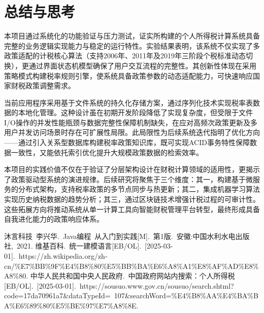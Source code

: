 \documentclass[a4paper, utf8]{ctexart}
\begin{document}
    \section{总结与思考}

    本项目通过系统化的功能验证与压力测试，证实所构建的个人所得税计算系统具备完整的业务逻辑实现能力与稳定的运行特性。实验结果表明，该系统不仅实现了多政策适配的计税核心算法（支持2006年、2011年及2019年三阶段个税标准动态切换），更通过界面状态机模型确保了用户交互流程的完整性。其创新性体现在采用策略模式构建税率规则引擎，使系统具备政策参数的动态适配能力，可快速响应国家财税政策调整需求。
    
    当前应用程序采用基于文件系统的持久化存储方案，通过序列化技术实现税率表数据的本地化管理。这种设计虽在初期开发阶段降低了实现复杂度，但受限于文件I/O操作的并发性能瓶颈与数据完整性保障机制缺失，在应对高频次政策更新及多用户并发访问场景时存在可扩展性局限。此局限性为后续系统迭代指明了优化方向——通过引入关系型数据库构建税率政策知识库，既可实现ACID事务特性保障数据一致性，又能依托索引优化提升大规模政策数据的检索效率。

    本项目的实践价值不仅在于验证了分层架构设计在财税计算领域的适用性，更揭示了政策驱动型系统的演进规律。后续研究将聚焦于三个维度：其一，构建基于微服务的分布式架构，支持税率政策的多节点同步与热更新；其二，集成机器学习算法实现历史纳税数据的趋势分析；其三，通过区块链技术增强计税过程的可审计性。这些拓展方向将推动系统从单一计算工具向智能财税管理平台转型，最终形成具备自我进化能力的政策响应体系。
    
    \let\cleardoublepage\clearpage
    
    \begin{thebibliography}{99}
         沐言科技\ 李兴华.\ Java编程\ 从入门到实践[M].\ 第1版.\ 安徽:中国水利水电出版社,\ 2021.
         维基百科.\ 统一建模语言[EB/OL].\ [2025-03-01].\ https://zh.wikipedia.org/zh-cn/\%E7\%BB\%9F\%E4\%B8\%80\%E5\%BB\%BA\%E6\%A8\%A1\%E8\%AF\%AD\%E8\%A8\%80.
         中华人民共和国中央人民政府.\ 中国政府网站内搜索：个人所得税[EB/OL].\ [2025-03-01].\ https://sousuo.www.gov.cn/sousuo/search.shtml?code=17da70961a7\&dataTypeId=\ 107\&searchWord=\%E4\%B8\%AA\%E4\%BA\%BA\%E6\%89\%80\%E5\%BE\%97\%E7\%A8\%8E.
    \end{thebibliography}
\end{document}

